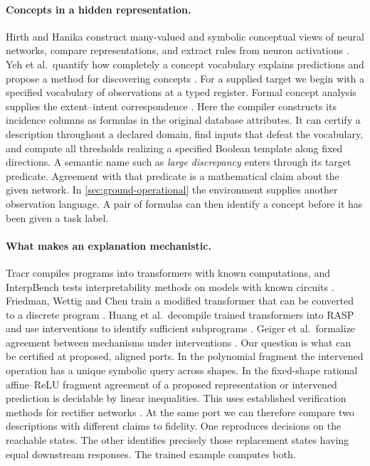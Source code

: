 \documentclass[11pt,a4paper]{article}
\theoremstyle{definition}
\theoremstyle{remark}\newaliascnt{remark}{theorem}
\numberwithin{equation}{section}
\begin{document}
\paragraph{Concepts in a hidden representation.}
Hirth and Hanika construct many-valued and symbolic conceptual views of neural networks, compare representations, and extract rules from neuron activations \cite{concept-neural-views}. Yeh et al.\ quantify how completely a concept vocabulary explains predictions and propose a method for discovering concepts \cite{concept-completeness}. For a supplied target we begin with a specified vocabulary of observations at a typed register. Formal concept analysis supplies the extent--intent correspondence \cite{fca-foundations}. Here the compiler constructs its incidence columns as formulas in the original database attributes. It can certify a description throughout a declared domain, find inputs that defeat the vocabulary, and compute all thresholds realizing a specified Boolean template along fixed directions. A semantic name such as \emph{large discrepancy} enters through its target predicate. Agreement with that predicate is a mathematical claim about the given network. In \cref{sec:ground-operational} the environment supplies another observation language. A pair of formulas can then identify a concept before it has been given a task label.

\paragraph{What makes an explanation mechanistic.}
Tracr compiles programs into transformers with known computations, and InterpBench tests interpretability methods on models with known circuits \cite{tracr,interpbench}. Friedman, Wettig and Chen train a modified transformer that can be converted to a discrete program \cite{transformer-programs}. Huang et al.\ decompile trained transformers into RASP and use interventions to identify sufficient subprograms \cite{huang-rasp}. Geiger et al.\ formalize agreement between mechanisms under interventions \cite{causal-abstraction}. Our question is what can be certified at proposed, aligned ports. In the polynomial fragment the intervened operation has a unique symbolic query across shapes. In the fixed-shape rational affine--ReLU fragment agreement of a proposed representation or intervened prediction is decidable by linear inequalities. This uses established verification methods for rectifier networks \cite{reluplex,relu-geometry}. At the same port we can therefore compare two descriptions with different claims to fidelity. One reproduces decisions on the reachable states. The other identifies precisely those replacement states having equal downstream responses. The trained example computes both.
\end{document}

